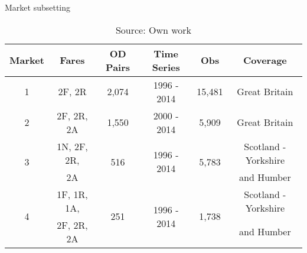 
\begin{table}[H] \centering 
  \caption{Market subsetting} 
  \label{tbl:market_subs} 
{\renewcommand\arraystretch{1.25}}
\begin{tabular} {cccccc}
\toprule
Market             & Fares      & OD Pairs & Time Series & Obs  & Coverage\\
\hline
1                  & 2F, 2R         & 2,074     & 1996 - 2014   & 15,481 & Great Britain\\
\hline
2                  & 2F, 2R, 2A     & 1,550     & 2000 - 2014 & 5,909  & Great Britain\\
\hline
\multirow{2}{*}{3} & 1N, 2F, 2R,  & \multirow{2}{*}{516} & \multirow{2}{*}{1996 - 2014} & \multirow{2}{*}{5,783} & Scotland - Yorkshire \\
                   &   2A         &                      &                              &                        & and Humber\\
\hline
\multirow{2}{*}{4} & 1F, 1R, 1A,& \multirow{2}{*}{251} & \multirow{2}{*}{1996 - 2014} & \multirow{2}{*}{1,738} & Scotland - Yorkshire \\ 
				   & 2F, 2R, 2A &                        &                              &                      & and Humber\\
\bottomrule
\end{tabular}%
\caption*{Source: Own work}
\end{table} 

